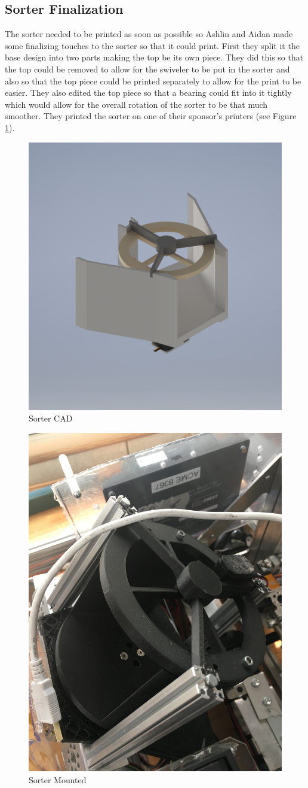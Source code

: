 \documentclass{article}
\newif\ifcontents
\begin{document}
\contentsfalse

 
\subsection{Sorter Finalization}
The sorter needed to be printed as soon as possible so Ashlin and Aidan made some finalizing touches to the sorter so that it could print. First they split it the base design into two parts making the top be its own piece. They did this so that the top could be removed to allow for the swiveler to be put in the sorter and also so that the top piece could be printed separately to allow for the print to be easier. They also edited the top piece so that a bearing could fit into it tightly which would allow for the overall rotation of the sorter to be that much smoother. They printed the sorter on one of their sponsor's printers (see Figure \ref{fig:Sorter CAD}).

\begin{figure}
    \centering
    \includegraphics[width=.6 \textwidth, ]{10_11-05/images/og_sorter[1].png}
    \caption{Sorter CAD}
    \label{fig:Sorter CAD}
\end{figure}

\begin{figure}
    \centering
    \includegraphics[width=.6 \textwidth, angle=270 ]{10_11-05/images/sorter.JPG}
    \caption{Sorter Mounted}
    \label{fig:Intake CAD}
\end{figure}
\end{document}
